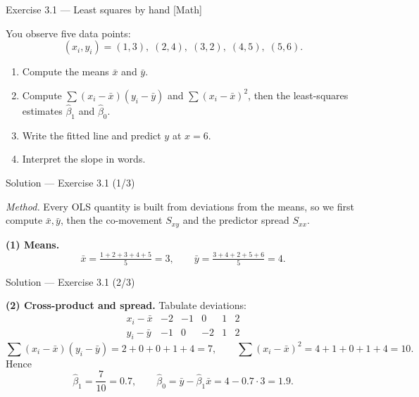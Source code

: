 \documentclass[aspectratio=169,11pt]{beamer}
\begin{document}
\begin{frame}{Exercise 3.1 --- Least squares by hand [Math]}
  \begin{exercise}
    You observe five data points:
    \[
      (x_i,y_i) = (1,3),\;(2,4),\;(3,2),\;(4,5),\;(5,6).
    \]
    \begin{enumerate}
      \item Compute the means $\bar x$ and $\bar y$.
      \item Compute $\sum (x_i-\bar x)(y_i-\bar y)$ and
            $\sum (x_i-\bar x)^2$, then the least-squares estimates
            $\hat\beta_1$ and $\hat\beta_0$.
      \item Write the fitted line and predict $y$ at $x=6$.
      \item Interpret the slope in words.
    \end{enumerate}
  \end{exercise}
\end{frame}

\begin{frame}{Solution --- Exercise 3.1 (1/3)}
  \begin{solutionbox}
    \emph{Method.} Every OLS quantity is built from deviations from the
    means, so we first compute $\bar x,\bar y$, then the co-movement
    $S_{xy}$ and the predictor spread $S_{xx}$.

    \textbf{(1) Means.}
    \[
      \bar x = \tfrac{1+2+3+4+5}{5}=3, \qquad
      \bar y = \tfrac{3+4+2+5+6}{5}=4.
    \]
  \end{solutionbox}
\end{frame}

\begin{frame}{Solution --- Exercise 3.1 (2/3)}
  \begin{solutionbox}
    \textbf{(2) Cross-product and spread.} Tabulate deviations:
    \[
      \begin{array}{c|ccccc}
        x_i-\bar x & -2 & -1 & 0 & 1 & 2\\
        y_i-\bar y & -1 & 0 & -2 & 1 & 2
      \end{array}
    \]
    \[
      \sum (x_i-\bar x)(y_i-\bar y) = 2+0+0+1+4 = 7,\qquad
      \sum (x_i-\bar x)^2 = 4+1+0+1+4 = 10.
    \]
    Hence
    \[
      \hat\beta_1 = \frac{7}{10}=0.7,\qquad
      \hat\beta_0 = \bar y - \hat\beta_1\bar x = 4-0.7\cdot 3 = 1.9.
    \]
  \end{solutionbox}
\end{frame}
\end{document}
